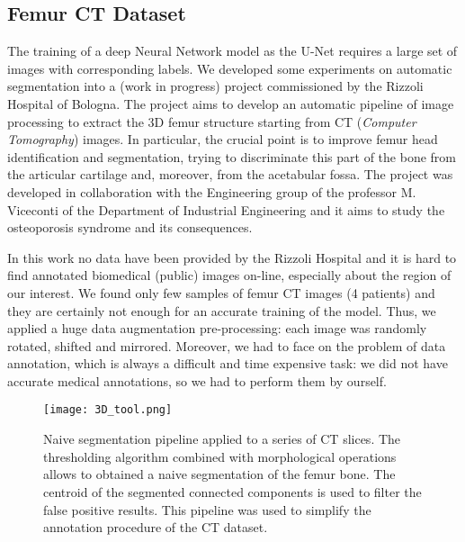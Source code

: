 \documentclass{standalone}
\begin{document}
\subsection[CT Dataset]{Femur CT Dataset}\label{segmentation:ct}

The training of a deep Neural Network model as the U-Net requires a large set of images with corresponding labels.
We developed some experiments on automatic segmentation into a (work in progress) project commissioned by the Rizzoli Hospital of Bologna.
The project aims to develop an automatic pipeline of image processing to extract the 3D femur structure starting from CT (\emph{Computer Tomography}) images.
In particular, the crucial point is to improve femur head identification and segmentation, trying to discriminate this part of the bone from the articular cartilage and, moreover, from the acetabular fossa.
The project was developed in collaboration with the Engineering group of the professor M. Viceconti of the Department of Industrial Engineering and it aims to study the osteoporosis syndrome and its consequences.

In this work no data have been provided by the Rizzoli Hospital and it is hard to find annotated biomedical (public) images on-line, especially about the region of our interest.
We found only few samples of femur CT images (4 patients) and they are certainly not enough for an accurate training of the model.
Thus, we applied a huge data augmentation pre-processing: each image was randomly rotated, shifted and mirrored.
Moreover, we had to face on the problem of data annotation, which is always a difficult and time expensive task: we did not have accurate medical annotations, so we had to perform them by ourself.

\begin{figure}[htbp]
\centering
\texttt{[image: 3D\_tool.png]}
\caption{Naive segmentation pipeline applied to a series of CT slices.
The thresholding algorithm combined with morphological operations allows to obtained a naive segmentation of the femur bone.
The centroid of the segmented connected components is used to filter the false positive results.
This pipeline was used to simplify the annotation procedure of the CT dataset.
}
\label{fig:3D_tool}
\end{figure}
\end{document}
